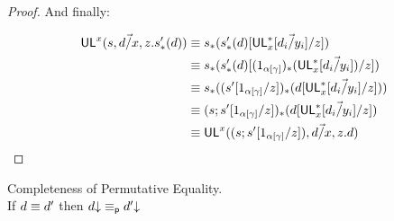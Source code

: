 \begin{proof}
And finally:

\begin{align*}
\mathsf{UL}^{x}_{}(s,\vec{d/x},z.s'_*(d)) 
&\equiv s_*(s'_*(d)[\mathsf{UL}^*_{x}[\vec{d_i/y_i}]/z]) \\
&\equiv s_*(s'_*(d)[(1_{\alpha[\gamma]})_*(\mathsf{UL}^*_{x}[\vec{d_i/y_i}])/z]) \\
&\equiv s_*((s'[1_{\alpha[\gamma]}/z])_*(d[\mathsf{UL}^*_{x}[\vec{d_i/y_i}]/z])) \\
&\equiv (s;s'[1_{\alpha[\gamma]}/z])_*(d[\mathsf{UL}^*_{x}[\vec{d_i/y_i}]/z]) \\
& \equiv \mathsf{UL}^{x}_{}((s;s'[1_{\alpha[\gamma]}/z]),\vec{d/x},z.d)
\end{align*}
\end{proof}

\begin{conjecture}{Completeness of Permutative Equality.}\\ \label{thm:permutative-completeness}
If $d \equiv d'$ then $d\mathord{\downarrow} \equiv_{\mathsf{p}} d'\mathord{\downarrow}$
\end{conjecture}


